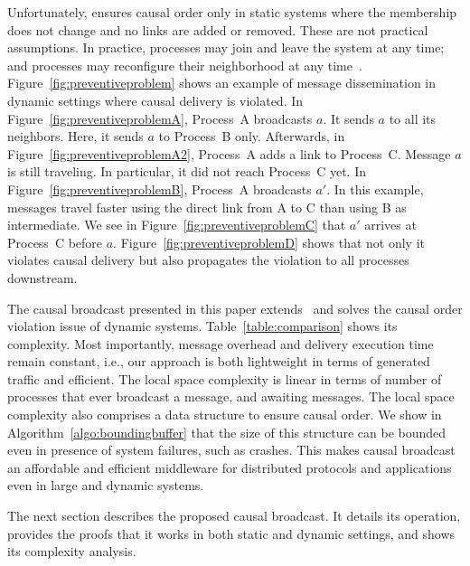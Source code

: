 Unfortunately, \cite{friedman2004causal} ensures causal order only in static
systems where the membership does not change and no links are added or
removed. These are not practical assumptions.  In practice, processes may join
and leave the system at any time; and processes may reconfigure their
neighborhood at any time~\cite{nedelec2016crate}.
Figure~\ref{fig:preventiveproblem} shows an example of message dissemination in
dynamic settings where causal delivery is violated. In
Figure~\ref{fig:preventiveproblemA}, Process~A broadcasts $a$. It sends $a$ to
all its neighbors. Here, it sends $a$ to Process~B only.  Afterwards, in
Figure~\ref{fig:preventiveproblemA2}, Process~A adds a link to
Process~C. Message $a$ is still traveling. In particular, it did not reach
Process~C yet. In Figure~\ref{fig:preventiveproblemB}, Process~A broadcasts
$a'$. In this example, messages travel faster using the direct link from A to C
than using B as intermediate.  We see in Figure~\ref{fig:preventiveproblemC}
that $a'$ arrives at Process~C before $a$. Figure~\ref{fig:preventiveproblemD}
shows that not only it violates causal delivery but also propagates the
violation to all processes downstream.

The causal broadcast presented in this paper extends~\cite{friedman2004causal}
and solves the causal order violation issue of dynamic systems.
Table~\ref{table:comparison} shows its complexity. Most importantly, message
overhead and delivery execution time remain constant, i.e., our approach is both
lightweight in terms of generated traffic and efficient. The local space
complexity is linear in terms of number of processes that ever broadcast a
message, and awaiting messages.  The local space complexity also comprises a
data structure to ensure causal order. We show in
Algorithm~\ref{algo:boundingbuffer} that the size of this structure can be
bounded even in presence of system failures, such as crashes.  This makes causal
broadcast an affordable and efficient middleware for distributed protocols and
applications even in large and dynamic systems.

The next section describes the proposed causal broadcast. It details its
operation, provides the proofs that it works in both static and dynamic
settings, and shows its complexity analysis.

